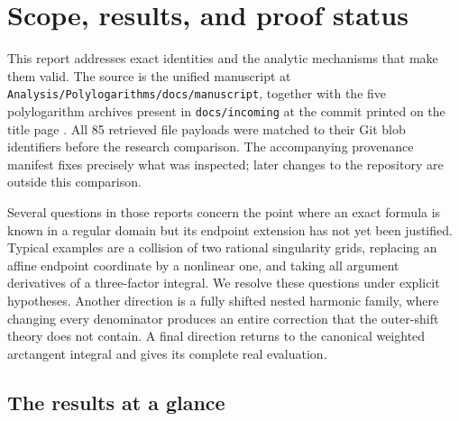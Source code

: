 \section{Scope, results, and proof status}
\label{xid:sec:introduction}

This report addresses exact identities and the analytic mechanisms that
make them valid. The source is the unified manuscript at
\texttt{Analysis/Polylogarithms/docs/manuscript}, together with the five
polylogarithm archives present in \texttt{docs/incoming} at the commit
printed on the title page \cite{ProveIt,IncomingGauss,IncomingMellin,
IncomingNested,IncomingContinuation,IncomingIdentities}. All 85 retrieved
file payloads were matched to their Git blob identifiers before the
research comparison. The accompanying provenance manifest fixes precisely
what was inspected; later changes to the repository are outside this
comparison.

Several questions in those reports concern the point where an exact
formula is known in a regular domain but its endpoint extension has not
yet been justified. Typical examples are a collision of two rational
singularity grids, replacing an affine endpoint coordinate by a nonlinear
one, and taking all argument derivatives of a three-factor integral.
We resolve these questions under explicit hypotheses. Another direction
is a fully shifted nested harmonic family, where changing every
denominator produces an entire correction that the outer-shift theory
does not contain. A final direction returns to the canonical weighted
arctangent integral and gives its complete real evaluation.

\subsection{The results at a glance}

